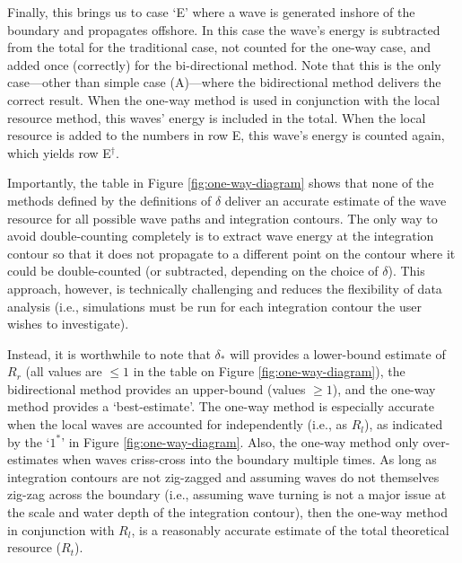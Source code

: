 Finally, this brings us to case `E' where a wave is generated inshore of the boundary and propagates offshore. In this case the wave's energy is subtracted from the total for the traditional case, not counted for the one-way case, and added once (correctly) for the bi-directional method. Note that this is the only case—other than simple case (A)—where the bidirectional method delivers the correct result. When the one-way method is used in conjunction with the local resource method, this waves' energy is included in the total.
When the local resource is added to the numbers in row E, this wave's energy is counted again, which yields row E$^\dagger$.

Importantly, the table in Figure \ref{fig:one-way-diagram} shows that none of the methods defined by the definitions of $\delta$ deliver an accurate estimate of the wave resource for all possible wave paths and integration contours. The only way to avoid double-counting completely is to extract wave energy at the integration contour so that it does not propagate to a different point on the contour where it could be double-counted (or subtracted, depending on the choice of $\delta$). This approach, however, is technically challenging and reduces the flexibility of data analysis (i.e., simulations must be run for each integration contour the user wishes to investigate).

Instead, it is worthwhile to note that $\delta_*$ will provides a lower-bound estimate of $R_r$ (all values are $\le 1$ in the table on Figure \ref{fig:one-way-diagram}), the bidirectional method provides an upper-bound (values $\ge 1$), and the one-way method provides a `best-estimate'. The one-way method is especially accurate when the local waves are accounted for independently (i.e., as $R_l$), as indicated by the `$1^*$' in Figure \ref{fig:one-way-diagram}. Also, the one-way method only over-estimates when waves criss-cross into the boundary multiple times. As long as integration contours are not zig-zagged and assuming waves do not themselves zig-zag across the boundary (i.e., assuming wave turning is not a major issue at the scale and water depth of the integration contour), then the one-way method in conjunction with $R_l$, is a reasonably accurate estimate of the total theoretical resource ($R_t$).



